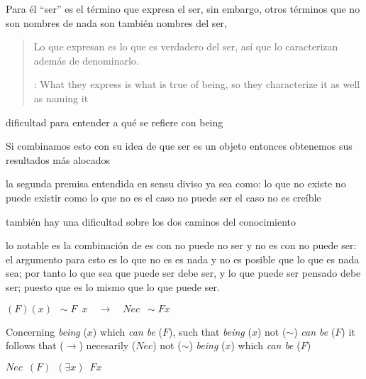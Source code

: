 Para él ``ser'' es el término que expresa el ser, sin embargo, otros términos que no son nombres de nada son también nombres del ser, \blockquote[{\cite[x]{anscombe1981parmenides}}: What they express is what is true of being, so they characterize it as well as naming it]{Lo que expresan es lo que es verdadero del ser, así que lo caracterizan además de denominarlo.}

dificultad para entender a qué se refiere con being

Si combinamos esto con su idea de que ser es un objeto entonces obtenemos sus resultados más alocados

la segunda premisa entendida en sensu diviso ya sea como: lo que no existe no puede existir como lo que no es el caso no puede ser el caso no es creíble


también hay una dificultad sobre los dos caminos del conocimiento

lo notable es la combinación de es con no puede no ser y no es con no puede ser: el argumento para esto es lo que no es es nada y no es posible que lo que es nada sea; por tanto lo que sea que puede ser debe ser, y lo que puede ser pensado debe ser; puesto que es lo mismo que lo que puede ser.

  $(F)(x)\enspace {\sim}F\enspace x\quad \longrightarrow\quad Nec\enspace
  {\sim}Fx$

  Concerning \emph{being} ($x$) which \emph{can be} ($F$), such that
  \emph{being} ($x$) not (${\sim}$) \emph{can be} ($F$) it follows that
  ($\longrightarrow$) necesarily ($Nec$) not (${\sim}$) \emph{being} ($x$) which
  \emph{can be} ($F$)

  $Nec\enspace (F)\enspace (\exists x)\enspace Fx$


